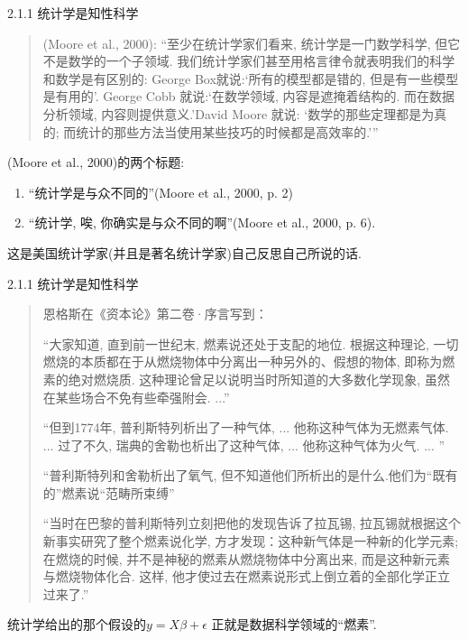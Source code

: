 \documentclass[compress,10pt,dvipsnames,notheorems]{beamer} %
\begin{document}
\begin{frame}{2.1.1 统计学是知性科学}
\begin{solu}
\begin{quotation}
(Moore et al., 2000):
“至少在统计学家们看来, 统计学是一门数学科学, 但它不是数学的一个子领域. 我们统计学家们甚至用格言律令就表明我们的科学和数学是有区别的: George Box就说:‘所有的模型都是错的, 但是有一些模型是有用的’. George Cobb 就说:‘在数学领域, 内容是遮掩着结构的. 而在数据分析领域, 内容则提供意义.’David Moore 就说: ‘数学的那些定理都是为真的; 而统计的那些方法当使用某些技巧的时候都是高效率的.’”
\end{quotation}
\end{solu}
(Moore et al., 2000)的两个标题:

\begin{solu}
\begin{enumerate}
\item “统计学是与众不同的”(Moore et al., 2000, p. 2)
\item “统计学, 唉, 你确实是与众不同的啊”(Moore et al., 2000, p. 6).
\end{enumerate}
\end{solu}
这是美国统计学家(并且是著名统计学家)自己反思自己所说的话.
\end{frame}

\begin{frame}{2.1.1 统计学是知性科学}
\begin{solu}
\begin{quotation}
恩格斯在《资本论》第二卷·序言写到：

“大家知道, 直到前一世纪末, 燃素说还处于支配的地位. 根据这种理论, 一切燃烧的本质都在于从燃烧物体中分离出一种另外的、假想的物体, 即称为燃素的绝对燃烧质. 这种理论曾足以说明当时所知道的大多数化学现象, 虽然在某些场合不免有些牵强附会. ...”

“但到1774年, 普利斯特列析出了一种气体, ... 他称这种气体为无燃素气体. ... 过了不久, 瑞典的舍勒也析出了这种气体, ... 他称这种气体为火气. ...  ”

“普利斯特列和舍勒析出了氧气, 但不知道他们所析出的是什么.他们为“既有的”燃素说“范畴所束缚”

“当时在巴黎的普利斯特列立刻把他的发现告诉了拉瓦锡, 拉瓦锡就根据这个新事实研究了整个燃素说化学, 方才发现：这种新气体是一种新的化学元素; 在燃烧的时候, 并不是神秘的燃素从燃烧物体中分离出来, 而是这种新元素与燃烧物体化合. 这样, 他才使过去在燃素说形式上倒立着的全部化学正立过来了.”
\end{quotation}
\end{solu}
统计学给出的那个假设的$y = X\beta + \epsilon$ 正就是数据科学领域的“燃素”.
\end{frame}
\end{document}
